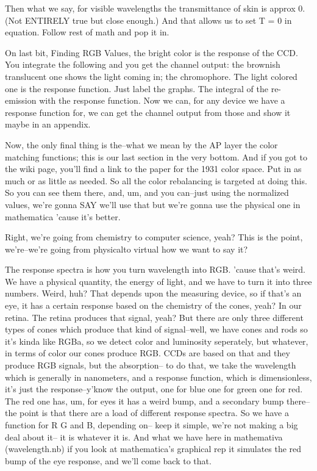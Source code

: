 Then what we say, for visible wavelengths the transmittance of skin is approx 0. (Not ENTIRELY true but close enough.) And that allows us to set T = 0 in equation. Follow rest of math and pop it in.

On last bit, Finding RGB Values, the bright color is the response of the CCD. You integrate the following and you get the channel output: the brownish translucent one shows the light coming in; the chromophore. The light colored one is the response function. Just label the graphs. The integral of the re-emission with the response function. Now we can, for any device we have a response function for, we can get the channel output from those and show it maybe in an appendix.

Now, the only final thing is the--what we mean by the AP layer the color matching functions; this is our last section in the very bottom. And if you got to the wiki page, you'll find a link to the paper for the 1931 color space. Put in as much or as little as needed. So all the color rebalancing is targeted at doing this. So you can see them there, and, um, and you can--just using the normalized values, we're gonna SAY we'll use that but we're gonna use the physical one in mathematica 'cause it's better. 


Right, we're going from chemistry to computer science, yeah? This is the point, we're--we're going from physicalto virtual how we want to say it?

The response spectra is how you turn wavelength into RGB. 'cause that's weird. We have a physical quantity, the energy of light, and we have to turn it into three numbers. Weird, huh? That depends upon the measuring device, so if that's an eye, it has a certain response based on the chemistry of the cones, yeah? In our retina. The retina produces that signal, yeah? But there are only three different types of cones which produce that kind of signal--well, we have cones and rods so it's kinda like RGBa, so we detect color and luminosity seperately, but whatever, in terms of color our cones produce RGB. CCDs are based on that and they produce RGB signals, but the absorption-- to do that, we take the wavelength which is generally in nanometers, and a response function, which is dimensionless, it's just the response--y'know the output, one for blue one for green one for red. The red one has, um, for eyes it has a weird bump, and a secondary bump there--the point is that there are a load of different response spectra. So we have a function for R G and B, depending on-- keep it simple, we're not making a big deal about it-- it is whatever it is. And what we have here in mathemativa (wavelength.nb) if you look at mathematica's graphical rep it simulates the red bump of the eye response, and we'll come back to that.

